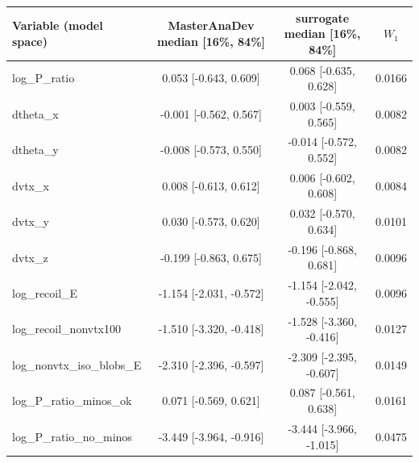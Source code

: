 \begin{tabular}{lccc}
\toprule
Variable (model space) & MasterAnaDev median [16\%, 84\%] & surrogate median [16\%, 84\%] & $W_1$ \\
\midrule
log\_P\_ratio & 0.053 [-0.643, 0.609] & 0.068 [-0.635, 0.628] & 0.0166 \\
dtheta\_x & -0.001 [-0.562, 0.567] & 0.003 [-0.559, 0.565] & 0.0082 \\
dtheta\_y & -0.008 [-0.573, 0.550] & -0.014 [-0.572, 0.552] & 0.0082 \\
dvtx\_x & 0.008 [-0.613, 0.612] & 0.006 [-0.602, 0.608] & 0.0084 \\
dvtx\_y & 0.030 [-0.573, 0.620] & 0.032 [-0.570, 0.634] & 0.0101 \\
dvtx\_z & -0.199 [-0.863, 0.675] & -0.196 [-0.868, 0.681] & 0.0096 \\
log\_recoil\_E & -1.154 [-2.031, -0.572] & -1.154 [-2.042, -0.555] & 0.0096 \\
log\_recoil\_nonvtx100 & -1.510 [-3.320, -0.418] & -1.528 [-3.360, -0.416] & 0.0127 \\
log\_nonvtx\_iso\_blobs\_E & -2.310 [-2.396, -0.597] & -2.309 [-2.395, -0.607] & 0.0149 \\
log\_P\_ratio\_minos\_ok & 0.071 [-0.569, 0.621] & 0.087 [-0.561, 0.638] & 0.0161 \\
log\_P\_ratio\_no\_minos & -3.449 [-3.964, -0.916] & -3.444 [-3.966, -1.015] & 0.0475 \\
\bottomrule
\end{tabular}
